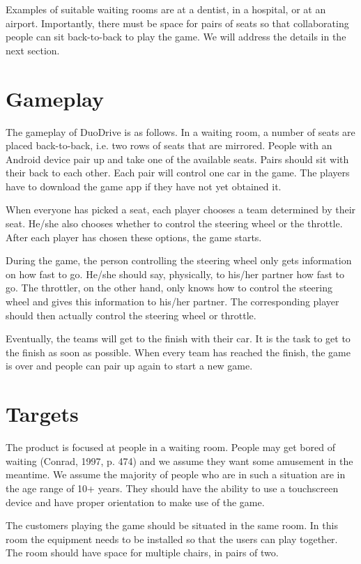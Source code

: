 \documentclass[11pt,twoside,a4paper]{article}
\begin{document}
Examples of suitable waiting rooms are at a dentist, in a hospital, or at an airport. Importantly, there must be space for pairs of seats so that collaborating people can sit back-to-back to play the game. We will address the details in the next section.


\section{Gameplay}
The gameplay of DuoDrive is as follows. In a waiting room, a number of seats are placed back-to-back, i.e. two rows of seats that are mirrored. People with an Android device pair up and take one of the available seats. Pairs should sit with their back to each other. Each pair will control one car in the game. The players have to download the game app if they have not yet obtained it.

When everyone has picked a seat, each player chooses a team determined by their seat. He/she also chooses whether to control the steering wheel or the throttle. After each player has chosen these options, the game starts.

During the game, the person controlling the steering wheel only gets information on how fast to go. He/she should say, physically, to his/her partner how fast to go. The throttler, on the other hand, only knows how to control the steering wheel and gives this information to his/her partner. The corresponding player should then actually control the steering wheel or throttle.

Eventually, the teams will get to the finish with their car. It is the task to get to the finish as soon as possible. When every team has reached the finish, the game is over and people can pair up again to start a new game.


\section{Targets}
The product is focused at people in a waiting room. People may get bored of waiting (Conrad, 1997, p. 474) and we assume they want some amusement in the meantime. We assume the majority of people who are in such a situation are in the age range of 10+ years. They should have the ability to use a touchscreen device and have proper orientation to make use of the game.

The customers playing the game should be situated in the same room. In this room the equipment needs to be installed so that the users can play together. The room should have space for multiple chairs, in pairs of two.
\end{document}
